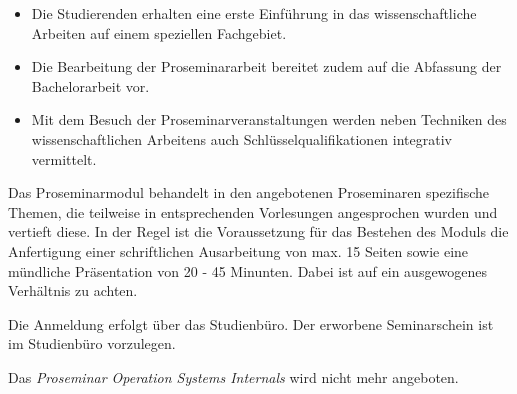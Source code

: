 \begin{module}
\begin{styleenv}
\begin{conditions}
\end{conditions}


\end{styleenv}

\begin{learningoutcomes}
\begin{itemize}\item Die Studierenden erhalten eine erste Einführung in das wissenschaftliche Arbeiten auf einem speziellen Fachgebiet.  \item Die Bearbeitung der Proseminararbeit bereitet zudem auf die Abfassung der Bachelorarbeit vor.  \item Mit dem Besuch der Proseminarveranstaltungen werden neben Techniken des wissenschaftlichen Arbeitens auch Schlüsselqualifikationen integrativ vermittelt.  \end{itemize}
\end{learningoutcomes}

\begin{content}
Das Proseminarmodul behandelt in den angebotenen Proseminaren spezifische Themen, die teilweise in entsprechenden Vorlesungen angesprochen wurden und vertieft diese. In der Regel ist die Voraussetzung für das Bestehen des Moduls die Anfertigung einer schriftlichen Ausarbeitung von max. 15 Seiten sowie eine mündliche Präsentation von 20 - 45 Minunten. Dabei ist auf ein ausgewogenes Verhältnis zu achten.


\end{content}

\begin{remarks}Die Anmeldung erfolgt über das Studienbüro. Der erworbene Seminarschein ist im Studienbüro vorzulegen.

 

Das \emph{Proseminar Operation Systems Internals }wird nicht mehr angeboten.

\end{remarks}

\end{module}

